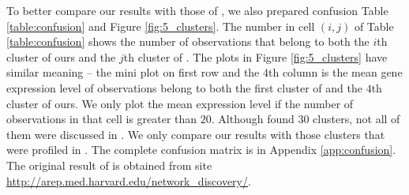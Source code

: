 \documentclass[12pt]{article}
\begin{document}
To better compare our results with those of \cite{tavazoie1999systematic}, we also prepared confusion Table \ref{table:confusion} and Figure \ref{fig:5_clusters}. The number in cell $(i,j)$ of Table \ref{table:confusion} shows the number of observations that belong to both the $i$th cluster of ours and the $j$th cluster of \cite{tavazoie1999systematic}. The plots in Figure \ref{fig:5_clusters} have similar meaning -- the mini plot on first row and the $4$th column is the mean gene expression level of observations belong to both the first cluster of \cite{tavazoie1999systematic} and the $4$th cluster of ours. We only plot the mean expression level if the number of observations in that cell is greater than $20$. Although \cite{tavazoie1999systematic} found $30$ clusters, not all of them were discussed in \cite{tavazoie1999systematic}. We only compare our results with those clusters that were profiled in \cite{tavazoie1999systematic}. The complete confusion matrix is in Appendix \ref{app:confusion}. The original result of \cite{tavazoie1999systematic} is obtained from site \url{http://arep.med.harvard.edu/network_discovery/}.
\end{document}

